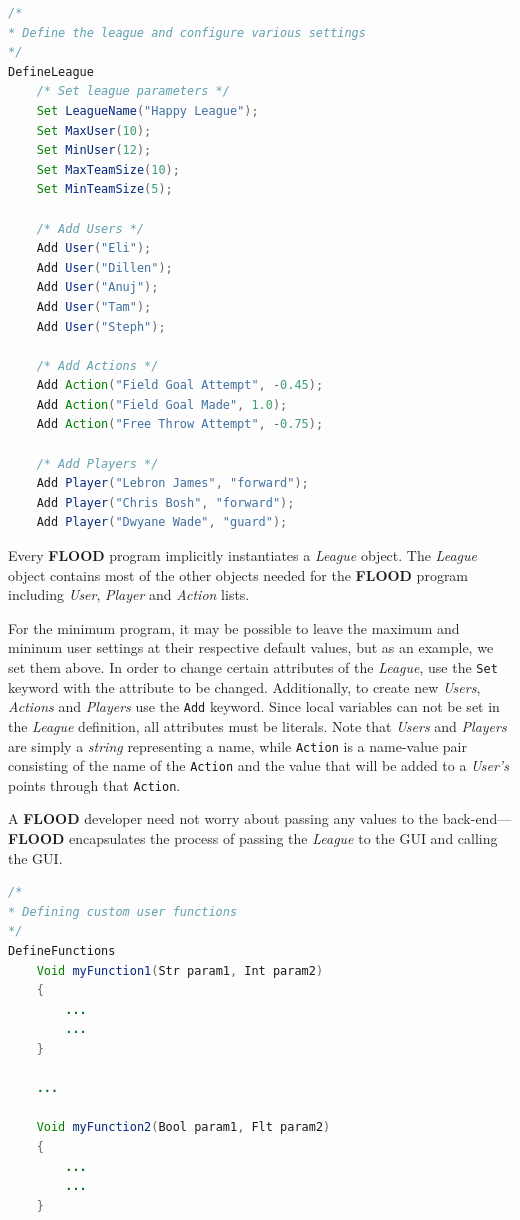 \documentclass[12pt]{report}
\begin{document}
\begin{singlespace}
\begin{lstlisting}[language=Java,label=some-code,caption=Defining the league and setting parameters]
/*
* Define the league and configure various settings
*/
DefineLeague
	/* Set league parameters */
	Set LeagueName("Happy League");
	Set MaxUser(10);
	Set MinUser(12);
	Set MaxTeamSize(10);
	Set MinTeamSize(5);
	
	/* Add Users */
	Add User("Eli");
	Add User("Dillen");
	Add User("Anuj");
	Add User("Tam");
	Add User("Steph");

	/* Add Actions */
	Add Action("Field Goal Attempt", -0.45);
	Add Action("Field Goal Made", 1.0);
	Add Action("Free Throw Attempt", -0.75);

	/* Add Players */
	Add Player("Lebron James", "forward");
	Add Player("Chris Bosh", "forward");
	Add Player("Dwyane Wade", "guard");
\end{lstlisting}
\end{singlespace}

Every \textbf{FLOOD} program implicitly instantiates a \textit{League} object. The \textit{League} object contains most of the other objects needed for the \textbf{FLOOD} program including \textit{User}, \textit{Player} and \textit{Action} lists.

For the minimum program, it may be possible to leave the maximum and mininum user settings at their respective default values, but as an example, we set them above. In order to change certain attributes of the \textit{League}, use the \texttt{Set} keyword with the attribute to be changed. Additionally, to create new \textit{Users}, \textit{Actions} and \textit{Players} use the \texttt{Add} keyword. Since local variables can not be set in the \textit{League} definition, all attributes must be literals. Note that \textit{Users} and \textit{Players} are simply a \textit{string} representing a name, while \texttt{Action} is a name-value pair consisting of the name of the \texttt{Action} and the value that will be added to a \textit{User's} points through that \texttt{Action}.

A \textbf{FLOOD} developer need not worry about passing any values to the back-end---\textbf{FLOOD} encapsulates the process of passing the \textit{League} to the GUI and calling the GUI.

\begin{singlespace}
\begin{lstlisting}[language=Java,label=some-code,caption=Defining functions]
/*
* Defining custom user functions
*/
DefineFunctions
	Void myFunction1(Str param1, Int param2)
	{
		...
		...
	}

	...

	Void myFunction2(Bool param1, Flt param2)
	{
		...
		...
	}
\end{lstlisting}
\end{singlespace}
\end{document}
